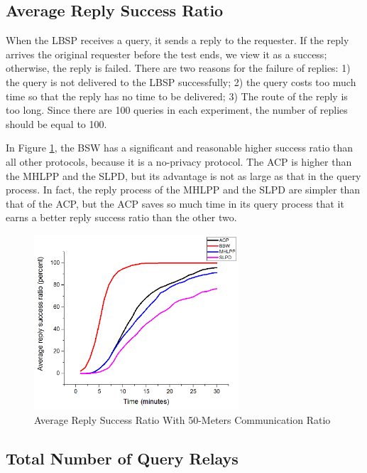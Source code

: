 \documentclass[conference]{IEEEtran}
\begin{document}
\subsection{ Average Reply Success Ratio}

\noindent When the LBSP receives a query, it sends a reply to the requester. If the reply arrives the original requester before the test ends, we view it as a success; otherwise, the reply is failed. There are two reasons for the failure of replies: 1) the query is not delivered to the LBSP successfully; 2) the query costs too much time so that the reply has no time to be delivered; 3) The route of the reply is too long. Since there are 100 queries in each experiment, the number of replies should be equal to 100. 

In Figure \ref{fig:F417AverageReplySuccessRatioWith50MetersCommunicationRatio}, the BSW has a significant and reasonable higher success ratio than all other protocols, because it is a no-privacy protocol. The ACP is higher than the MHLPP and the SLPD, but its advantage is not as large as that in the query process. In fact, the reply process of the MHLPP and the SLPD are simpler than that of the ACP, but the ACP saves so much time in its query process that it earns a better reply success ratio than the other two.

\begin{figure} [hbtp]
  \centering 
  \includegraphics[width=3in]{figures/F417AverageReplySuccessRatioWith50MetersCommunicationRatio.png}
  \caption{Average Reply Success Ratio With 50-Meters Communication Ratio} 
  \label{fig:F417AverageReplySuccessRatioWith50MetersCommunicationRatio} %
\end{figure}

\subsection{ Total Number of Query Relays}
\end{document}
